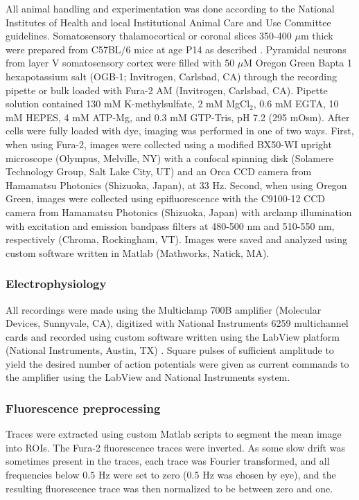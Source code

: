 All animal handling and experimentation was done according to the National Institutes of Health and local Institutional Animal Care and Use Committee guidelines. Somatosensory thalamocortical or coronal slices 350-400 $\mu$m thick were prepared from C57BL/6 mice at age P14 as described \cite{MacLeanYuste05}. Pyramidal neurons from layer V somatosensory cortex were filled with 50 $\mu$M Oregon Green Bapta 1 hexapotassium salt (OGB-1; Invitrogen, Carlsbad, CA) through the recording pipette or bulk loaded with Fura-2 AM (Invitrogen, Carlsbad, CA). Pipette solution contained 130 mM K-methylsulfate, 2 mM MgCl$_2$, $0.6$ mM EGTA, 10 mM HEPES, 4 mM ATP-Mg, and $0.3$ mM GTP-Tris, pH 7.2 (295 mOsm).  After cells were fully loaded with dye, imaging was performed in one of two ways.  First, when using Fura-2, images were collected using a modified BX50-WI upright microscope (Olympus, Melville, NY) with a confocal spinning disk (Solamere Technology Group, Salt Lake City, UT) and an Orca CCD camera from Hamamatsu Photonics (Shizuoka, Japan), at 33 Hz.  Second, when using Oregon Green, images were collected using epifluorescence with the C9100-12 CCD camera from Hamamatsu Photonics (Shizuoka, Japan) with arclamp illumination with excitation and emission bandpass filters at 480-500 nm and 510-550 nm, respectively  (Chroma, Rockingham, VT). Images were saved and analyzed using custom software written in Matlab (Mathworks, Natick, MA).

\subsubsection{Electrophysiology}

All recordings were made using the Multiclamp 700B amplifier (Molecular Devices, Sunnyvale, CA), digitized with National Instruments 6259 multichannel cards and recorded using custom software written using the LabView platform (National Instruments, Austin, TX) .  Square pulses of sufficient amplitude to yield the desired number of action potentials were given as current commands to the amplifier using the LabView and National Instruments system.

\subsubsection{Fluorescence preprocessing}

Traces were extracted using custom Matlab scripts to segment the mean image into ROIs.  The Fura-2 fluorescence traces were inverted.  As some slow drift was sometimes present in the traces, each trace was Fourier transformed, and all frequencies below $0.5$ Hz were set to zero ($0.5$ Hz was chosen by eye), and the resulting fluorescence trace was then normalized to be between zero and one.  







